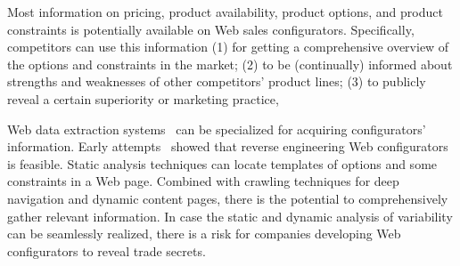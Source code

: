 Most information on pricing, product availability, product options, and product constraints is potentially available on Web sales configurators.
Specifically, competitors can use this information (1) for getting a comprehensive overview of the options and constraints in the market; (2) to be (continually) informed about strengths and weaknesses of other competitors' product lines; (3) to publicly reveal a certain superiority or marketing practice, \etc
  
 Web data extraction systems~\cite{baumgartner2009,Ferrara2014} can be specialized for acquiring configurators' information. 
 Early attempts~\cite{ebrahimCSMR2014} showed that reverse engineering Web configurators is feasible. Static analysis techniques can locate templates of options and some constraints in a Web page. %
  Combined with crawling techniques for deep navigation and dynamic content pages, there is the potential to comprehensively gather relevant information. 
  In case the static and dynamic analysis of variability can be seamlessly realized, there is a risk for companies developing Web configurators to reveal trade secrets. 













